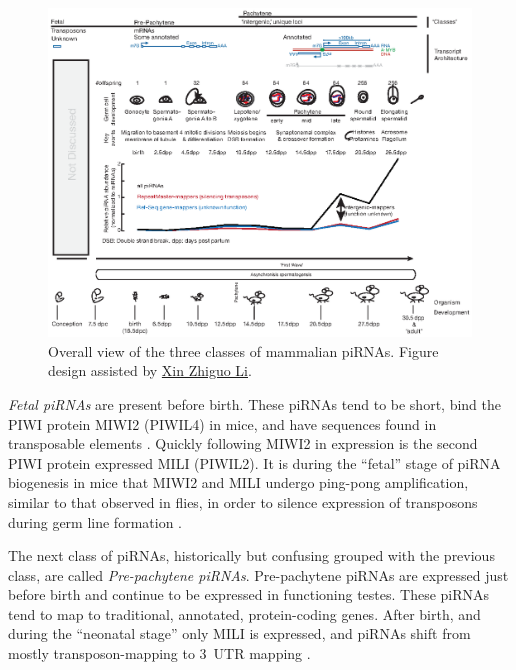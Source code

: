 {   \begin{figure} %
      \centering 
      \includegraphics{Figures/Intro/MammalianPiRNAClassesOverTime.eps}
      \caption[Different Classes of mammalian piRNAs]
      {
        Overall view of the three classes of mammalian piRNAs. Figure design assisted by \href{mailto:xin.li@umassmed.edu}{Xin Zhiguo Li}.
        } \label{Intro:fig:Mammalian piRNA classes}
      \end{figure}

    \textit{Fetal piRNAs} are present before birth. These piRNAs tend to be short, bind the PIWI protein MIWI2 (PIWIL4) in mice, and have sequences found in transposable elements \citep{Carmell2007}. Quickly following MIWI2 in expression is the second PIWI protein expressed MILI (PIWIL2). It is during the ``fetal'' stage of piRNA biogenesis in mice that MIWI2 and MILI undergo ping-pong amplification, similar to that observed in flies, in order to silence expression of transposons during germ line formation  \citep{Kuramochi-Miyagawa2004, Aravin2006, Aravin2008a}.

    The next class of piRNAs, historically but confusing grouped with the previous class, are called \textit{Pre-pachytene piRNAs}. Pre-pachytene piRNAs are expressed just before birth and continue to be expressed in functioning testes. These piRNAs tend to map to traditional, annotated, protein-coding genes. After birth, and during the ``neonatal stage'' only MILI is expressed, and piRNAs shift from mostly transposon-mapping to 3\textprime~UTR mapping \citep{Robine2009}.

}
